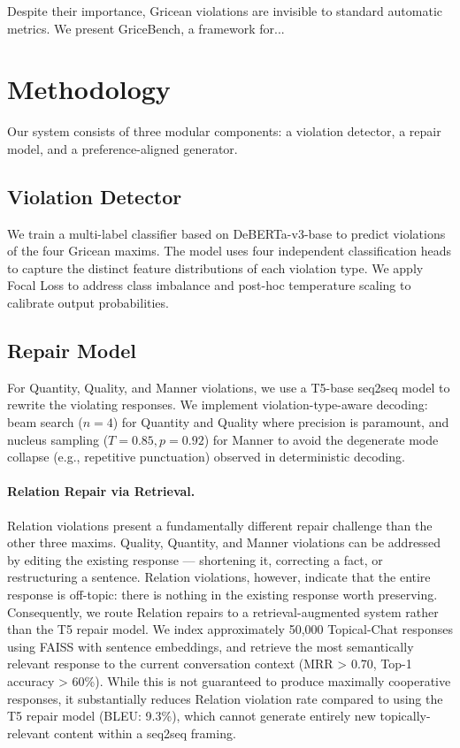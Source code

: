\documentclass[11pt]{article}
\begin{document}
Despite their importance, Gricean violations are invisible to standard
automatic metrics.
We present GriceBench, a framework for...

\section{Methodology}
\label{sec:method}
Our system consists of three modular components: a violation detector, a repair model, and a preference-aligned generator.

\subsection{Violation Detector}
We train a multi-label classifier based on DeBERTa-v3-base \citep{he2021debertav3} to predict violations of the four Gricean maxims. The model uses four independent classification heads to capture the distinct feature distributions of each violation type. We apply Focal Loss \citep{lin2017focal} to address class imbalance and post-hoc temperature scaling to calibrate output probabilities.

\subsection{Repair Model}
\label{sec:repair}
For Quantity, Quality, and Manner violations, we use a T5-base \citep{raffel2020exploring} seq2seq model to rewrite the violating responses. We implement violation-type-aware decoding: beam search ($n=4$) for Quantity and Quality where precision is paramount, and nucleus sampling ($T=0.85, p=0.92$) for Manner to avoid the degenerate mode collapse (e.g., repetitive punctuation) observed in deterministic decoding.

\paragraph{Relation Repair via Retrieval.}
Relation violations present a fundamentally different repair challenge than
the other three maxims. Quality, Quantity, and Manner violations can be
addressed by editing the existing response --- shortening it, correcting a fact,
or restructuring a sentence. Relation violations, however, indicate that the
entire response is off-topic: there is nothing in the existing response worth
preserving. Consequently, we route Relation repairs to a retrieval-augmented
system rather than the T5 repair model. We index approximately 50,000 Topical-Chat
responses using FAISS \cite{johnson2019billion} with sentence embeddings, and
retrieve the most semantically relevant response to the current conversation
context (MRR > 0.70, Top-1 accuracy > 60\%). While this is not guaranteed to
produce maximally cooperative responses, it substantially reduces Relation
violation rate compared to using the T5 repair model (BLEU: 9.3\%), which
cannot generate entirely new topically-relevant content within a seq2seq framing.
\end{document}
